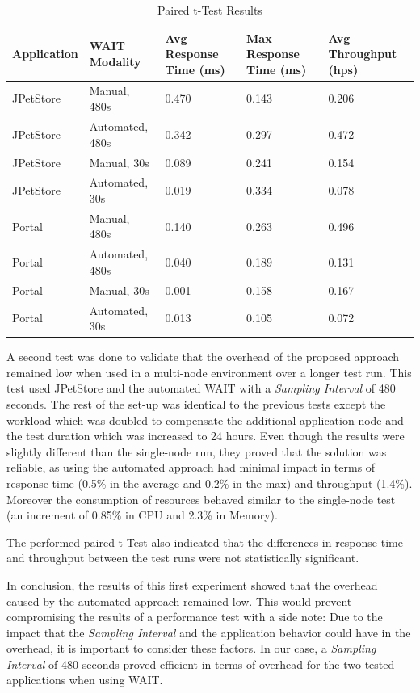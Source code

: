 \documentclass[runningheads,a4paper]{llncs}
\begin{document}
\begin{table}[!h]
\caption{Paired t-Test Results}
\label{tTest1}
\centering
\begin{tabular}{p{}|p{}|p{}|p{}|p{}}
\hline
\bfseries Application & \bfseries WAIT Modality & \bfseries Avg Response Time
(ms)& \bfseries Max Response Time (ms)& \bfseries Avg Throughput (hps)\\
\hline
JPetStore & 	Manual, 480s 			& 0.470 & 0.143	& 0.206\\
JPetStore & 	Automated, 480s 		& 0.342	& 0.297	& 0.472\\
JPetStore & 	Manual, 30s 			& 0.089	& 0.241	& 0.154\\
JPetStore & 	Automated, 30s 			& 0.019	& 0.334	& 0.078\\
\hline
Portal 	& 	Manual, 480s 			& 0.140 & 0.263	& 0.496\\
Portal 	& 	Automated, 480s 		& 0.040	& 0.189	& 0.131\\
Portal 	& 	Manual, 30s 			& 0.001	& 0.158	& 0.167\\
Portal 	& 	Automated, 30s 			& 0.013	& 0.105	& 0.072\\
\hline
\end{tabular}
\end{table}

A second test was done to validate that the overhead of the proposed approach
remained low when used in a multi-node environment over a longer test run.
This test used JPetStore and the automated WAIT with a \emph{Sampling Interval} of 480 seconds.
The rest of the set-up was identical to the previous tests except the workload
which was doubled to compensate the additional application node and the test
duration which was increased to 24 hours. Even though the results were slightly
different than the single-node run, they proved that the solution was reliable,
as using the automated approach had minimal impact in terms of response time
(0.5\% in the average and 0.2\% in the max) and throughput (1.4\%). Moreover the
consumption of resources behaved similar to the single-node test (an increment
of 0.85\% in CPU and 2.3\% in Memory).

The performed paired t-Test also indicated that the differences in response time
and throughput between the test runs were not statistically significant.

In conclusion, the results of this first experiment showed that the overhead
caused by the automated approach remained low. This would prevent compromising
the results of a performance test with a side note: Due to the impact that the
\emph{Sampling Interval} and the application behavior could have in the
overhead, it is important to consider these factors. In our case, a
\emph{Sampling Interval} of 480 seconds proved efficient in terms of
overhead for the two tested applications when using WAIT.
\end{document}
